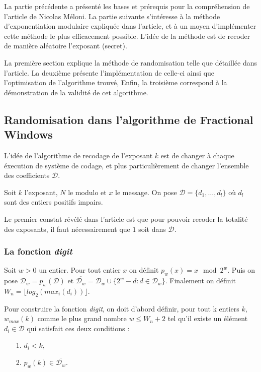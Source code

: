 \documentclass[12pt, a4paper]{memoir}
\begin{document}
La partie précédente a présenté les bases et prérequis pour la compréhension de l'article de Nicolas Méloni.
La partie suivante s'intéresse à la méthode d'exponentiation modulaire expliquée dans l'article, 
et à un moyen d'implémenter cette méthode le plus efficacement possible. 
L'idée de la méthode est de recoder de manière aléatoire l'exposant (secret).

La première section explique la méthode de randomisation telle que détaillée dans l'article.
La deuxième présente l'implémentation de celle-ci ainsi que l'optimisation de l'algorithme trouvé, 
Enfin, la troisième correspond à la démonstration de la validité de cet algorithme.

\subsection{Randomisation dans l'algorithme de Fractional Windows}

L'idée de l'algorithme de recodage de l'exposant $k$ est de changer à chaque éxecution de système de codage,
et plus particulièrement de changer l'ensemble des coefficients $\mathcal{D}$.

Soit $k$ l'exposant, $N$ le modulo et $x$ le message.
On pose $\mathcal{D} = \{d_1,\ldots,d_l\}$ où $d_l$ sont des entiers positifs impairs.

Le premier constat révélé dans l'article est que pour pouvoir recoder la totalité des exposants, il faut nécessairement
que $1$ soit dans $\mathcal{D}$.

\subsubsection{La fonction \emph{digit}}

Soit $w > 0$ un entier. Pour tout entier $x$ on définit $p_w(x) = x \mod 2^w $. 
Puis on pose $\mathcal{D}_w = p_w(\mathcal{D})$ et $\overline{\mathcal{D}_w} = \mathcal{D}_w \cup \{2^w - d: d \in \mathcal{D}_w\}$.
Finalement on définit $W_n = \lfloor log_2(max_i(d_i)) \rfloor$.

Pour construire la fonction \emph{digit}, on doit d'abord définir, pour tout k entiers $k$, $w_{max}(k)$ comme le plus grand nombre $w \leq W_n+2$ tel qu'il existe un élément $d_i \in \mathcal{D}$ qui satisfait ces deux conditions :

\begin{itemize}
 \item [1.] $d_i < k$,
 \item [2.] $p_w(k) \in \overline{\mathcal{D}_w}$.
\end{itemize}
\end{document}
